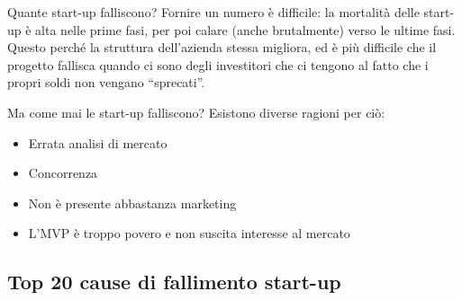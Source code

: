 Quante start-up falliscono? Fornire un numero è difficile: la mortalità delle
start-up è alta nelle prime fasi, per poi calare (anche brutalmente) verso le
ultime fasi. Questo perché la struttura dell'azienda stessa migliora, ed è più
difficile che il progetto fallisca quando ci sono degli investitori che ci
tengono al fatto che i propri soldi non vengano ``sprecati''.

Ma come mai le start-up falliscono? Esistono diverse ragioni per ciò:
\begin{itemize}
 \item Errata analisi di mercato
 \item Concorrenza
 \item Non è presente abbastanza marketing
 \item L'MVP è troppo povero e non suscita interesse al mercato
\end{itemize}

\subsection{Top 20 cause di fallimento start-up}


